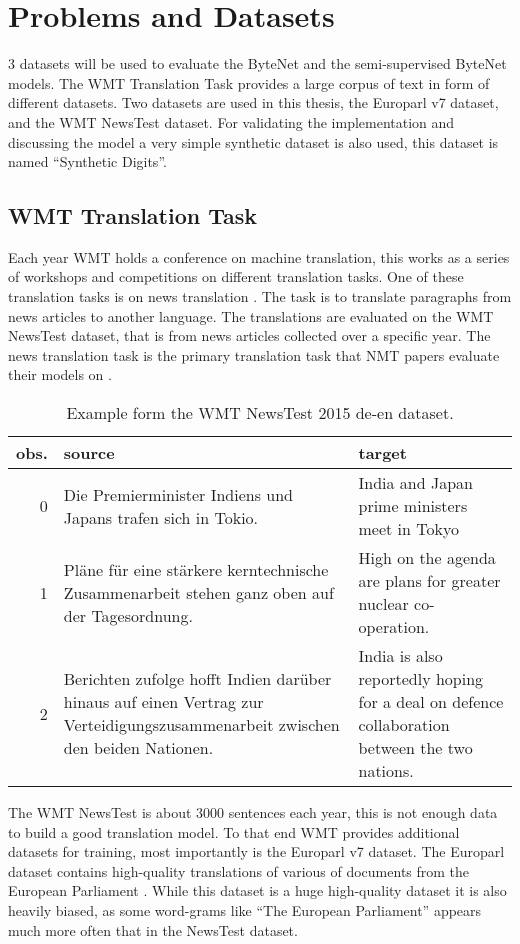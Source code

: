 
\section{Problems and Datasets}

3 datasets will be used to evaluate the ByteNet and the semi-supervised ByteNet models. The WMT Translation Task provides a large corpus of text in form of different datasets. Two datasets are used in this thesis, the Europarl v7 dataset, and the WMT NewsTest dataset. For validating the implementation and discussing the model a very simple synthetic dataset is also used, this dataset is named ``Synthetic Digits''.

\subsection{WMT Translation Task}

Each year WMT holds a conference on machine translation, this works as a series of workshops and competitions on different translation tasks. One of these translation tasks is on news translation \cite{wmt16}. The task is to translate paragraphs from news articles to another language. The translations are evaluated on the WMT NewsTest dataset, that is from news articles collected over a specific year. The news translation task is the primary translation task that NMT papers evaluate their models on \cite{bytenet, bahdanau-2015-nmt, sutskever-2014-nmt}.

\begin{table}[H]
\centering
\begin{tabular}{r|p{5cm} p{5cm}}
	obs. & source & target\\ \hline
     0 & Die Premierminister Indiens und Japans trafen sich in Tokio. & India and Japan prime ministers meet in Tokyo \\
     1 & Pläne für eine stärkere kerntechnische Zusammenarbeit stehen ganz oben auf der Tagesordnung. & High on the agenda are plans for greater nuclear co-operation. \\
     2 & Berichten zufolge hofft Indien darüber hinaus auf einen Vertrag zur Verteidigungszusammenarbeit zwischen den beiden Nationen. & India is also reportedly hoping for a deal on defence collaboration between the two nations.
\end{tabular}
\caption{Example form the WMT NewsTest 2015 de-en dataset.}
\end{table}

The WMT NewsTest is about 3000 sentences each year, this is not enough data to build a good translation model. To that end WMT provides additional datasets for training, most importantly is the Europarl v7 dataset. The Europarl dataset contains high-quality translations of various of documents from the European Parliament \cite{europarl}. While this dataset is a huge high-quality dataset it is also heavily biased, as some word-grams like ``The European Parliament'' appears much more often that in the NewsTest dataset.

